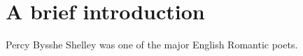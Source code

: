 \documentclass{doc}
\begin{document}
	\section{A brief introduction}
	Percy Bysshe Shelley was one of the major English Romantic poets.
\end{document}
